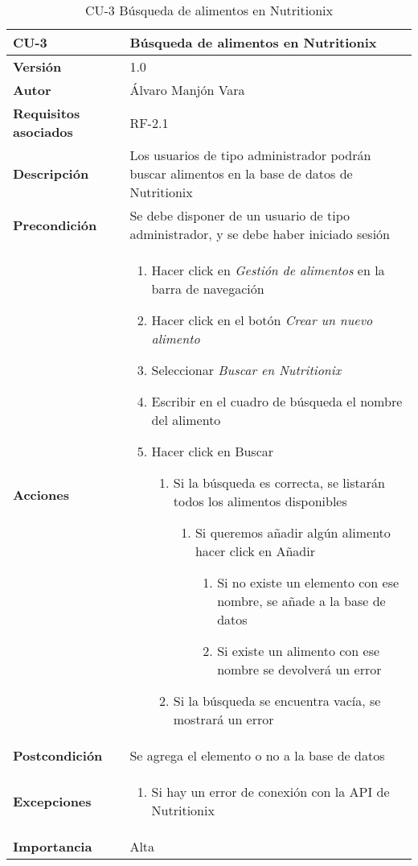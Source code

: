 \begin{table}[htp]
	\centering
	\begin{tabularx}{\linewidth}{ p{} p{} }
		\toprule
		\textbf{CU-3}    & \textbf{Búsqueda de alimentos en Nutritionix}\\
		\toprule
		\textbf{Versión}              & 1.0    \\
		\textbf{Autor}                & Álvaro Manjón Vara \\
		\textbf{Requisitos asociados} & RF-2.1 \\
		\textbf{Descripción}          & Los usuarios de tipo administrador podrán buscar alimentos en la base de datos de Nutritionix \\
		\textbf{Precondición}         & Se debe disponer de un usuario de tipo administrador, y se debe haber iniciado sesión \\
		\textbf{Acciones}             &
		\begin{enumerate}
			\def\labelenumi{\arabic{enumi}.}
			\tightlist
			\item Hacer click en \textit{Gestión de alimentos} en la barra de navegación
			\item Hacer click en el botón \textit{Crear un nuevo alimento}
			\item Seleccionar \textit{Buscar en Nutritionix}
			\item Escribir en el cuadro de búsqueda el nombre del alimento
			\item Hacer click en Buscar
			\begin{enumerate}
				\item Si la búsqueda es correcta, se listarán todos los alimentos disponibles
				\begin{enumerate}
					\item Si queremos añadir algún alimento hacer click en Añadir
					\begin{enumerate}
  						\item Si no existe un elemento con ese nombre, se añade a la base de datos
  						\item Si existe un alimento con ese nombre se devolverá un error
					\end{enumerate}
				\end{enumerate}
				\item Si la búsqueda se encuentra vacía, se mostrará un error
			\end{enumerate}
		\end{enumerate}\\
		\textbf{Postcondición}        & Se agrega el elemento o no a la base de datos \\
		\textbf{Excepciones}          & \begin{enumerate}
			\def\labelenumi{\arabic{enumi}.}
			\tightlist
			\item Si hay un error de conexión con la API de Nutritionix
			\end{enumerate}
			 \\
		\textbf{Importancia}          & Alta \\
		\bottomrule
	\end{tabularx}
	\caption{CU-3 Búsqueda de alimentos en Nutritionix}
\end{table}
\afterpage{\clearpage}

